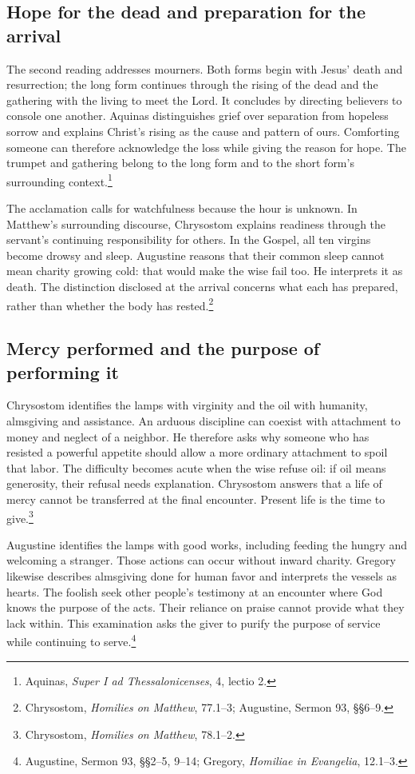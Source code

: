 \subsection{Hope for the dead and preparation for the arrival}
The second reading addresses mourners. Both forms begin with Jesus' death and resurrection; the long form continues through the rising of the dead and the gathering with the living to meet the Lord. It concludes by directing believers to console one another. Aquinas distinguishes grief over separation from hopeless sorrow and explains Christ's rising as the cause and pattern of ours. Comforting someone can therefore acknowledge the loss while giving the reason for hope. The trumpet and gathering belong to the long form and to the short form's surrounding context.\footnote{Aquinas, \textit{Super I ad Thessalonicenses}, 4, lectio 2.}

The acclamation calls for watchfulness because the hour is unknown. In Matthew's surrounding discourse, Chrysostom explains readiness through the servant's continuing responsibility for others. In the Gospel, all ten virgins become drowsy and sleep. Augustine reasons that their common sleep cannot mean charity growing cold: that would make the wise fail too. He interprets it as death. The distinction disclosed at the arrival concerns what each has prepared, rather than whether the body has rested.\footnote{Chrysostom, \textit{Homilies on Matthew}, 77.1--3; Augustine, Sermon 93, §§6--9.}
\newpage
\subsection{Mercy performed and the purpose of performing it}
Chrysostom identifies the lamps with virginity and the oil with humanity, almsgiving and assistance. An arduous discipline can coexist with attachment to money and neglect of a neighbor. He therefore asks why someone who has resisted a powerful appetite should allow a more ordinary attachment to spoil that labor. The difficulty becomes acute when the wise refuse oil: if oil means generosity, their refusal needs explanation. Chrysostom answers that a life of mercy cannot be transferred at the final encounter. Present life is the time to give.\footnote{Chrysostom, \textit{Homilies on Matthew}, 78.1--2.}

Augustine identifies the lamps with good works, including feeding the hungry and welcoming a stranger. Those actions can occur without inward charity. Gregory likewise describes almsgiving done for human favor and interprets the vessels as hearts. The foolish seek other people's testimony at an encounter where God knows the purpose of the acts. Their reliance on praise cannot provide what they lack within. This examination asks the giver to purify the purpose of service while continuing to serve.\footnote{Augustine, Sermon 93, §§2--5, 9--14; Gregory, \textit{Homiliae in Evangelia}, 12.1--3.}

